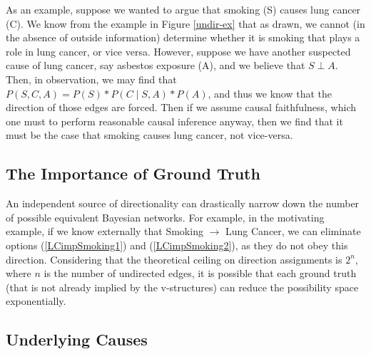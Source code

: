\documentclass{article}
\begin{document}
	As an example, suppose we wanted to argue that smoking (S) causes lung cancer (C).
	We know from the example in Figure \ref{undir-ex} that as drawn, we cannot (in the absence of outside information) determine whether it is smoking that plays a role in lung cancer, or vice versa.
	However, suppose we have another suspected cause of lung cancer, say asbestos exposure (A), and we believe that $S \perp A$.
	Then, in observation, we may find that $P(S, C, A) = P(S)*P(C \mid S, A)*P(A)$, and thus we know that the direction of those edges are forced.
	Then if we assume causal faithfulness, which one must to perform reasonable causal inference anyway, then we find that it must be the case that smoking causes lung cancer, not vice-versa.
	
	\subsection{The Importance of Ground Truth}
	An independent source of directionality can drastically narrow down the number of possible equivalent Bayesian networks. For example, in the motivating example, if we know externally that Smoking $\rightarrow$ Lung Cancer, we can eliminate options (\ref{LCimpSmoking1}) and (\ref{LCimpSmoking2}), as they do not obey this direction.
	Considering that the theoretical ceiling on direction assignments is $2^n$, where $n$ is the number of undirected edges, it is possible that each ground truth (that is not already implied by the v-structures) can reduce the possibility space exponentially.
	
	\subsection{Underlying Causes}
	
	
	
	
	\appendix
	
\end{document}
